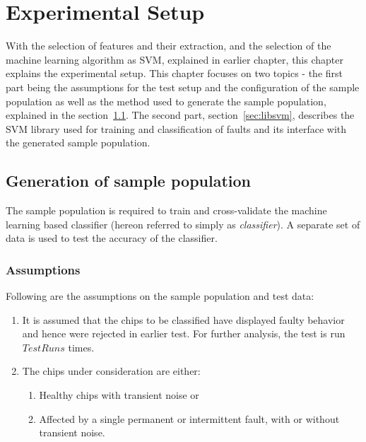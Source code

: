 \chapter{Experimental Setup}
\label{chap:chapter5}
With the selection of features and their extraction, and the selection of the machine learning algorithm as SVM, explained in earlier chapter, this chapter explains the experimental setup. This chapter focuses on two topics - the first part being the assumptions for the test setup and the configuration of the sample population as well as the method used to generate the sample population, explained in the section~\ref{sec:gsp}. The second part, section~\ref{sec:libsvm}, describes the SVM library used for training and classification of faults and its interface with the generated sample population.
\section{Generation of sample population}
\label{sec:gsp}
The sample population is required to train and cross-validate the machine learning based classifier (hereon referred to simply as \emph{classifier}). A separate set of data is used to test the accuracy of the classifier.
\subsection{Assumptions}
\label{sec:gsp:assumptions}
Following are the assumptions on the sample population and test data:
\begin{enumerate}
  \item It is assumed that the chips to be classified have displayed faulty behavior and hence were rejected in earlier test. For further analysis, the test is run $TestRuns$ times. 
  \item The chips under consideration are either:
		  \begin{enumerate}
    		\item Healthy chips with transient noise or
    		\item Affected by a single permanent or intermittent fault, with or without transient noise.
 		 \end{enumerate}
\end{enumerate}

